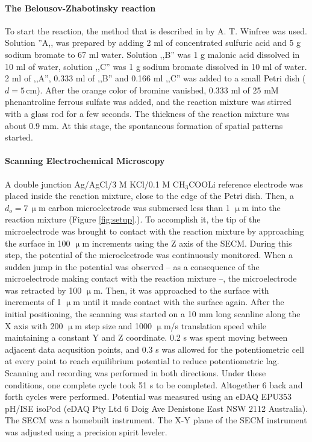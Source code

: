 \documentclass[3p, twocolumn]{elsarticle}
\begin{document}
\paragraph{The Belousov-Zhabotinsky reaction} 
To start the reaction, the method that is described in \cite{winfree} by A. T. Winfree was used.
Solution ''A,, was prepared by adding 2 ml of concentrated sulfuric acid and 5 g sodium bromate to 67 ml water.
Solution ,,B'' was 1 g malonic acid dissolved in 10 ml of water, solution ,,C'' was 1 g sodium bromate dissolved in 10 ml of water.
2 ml of ,,A'', 0.333 ml of ,,B'' and 0.166 ml ,,C'' was added to a small Petri dish ($d=5 \,$cm).
After the orange color of bromine vanished, 0.333 ml of 25 mM phenantroline ferrous sulfate was added, and the reaction mixture was stirred with a glass rod for a few seconds.
The thickness of the reaction mixture was about 0.9 mm.
At this stage, the spontaneous formation of spatial patterns started.

\paragraph{Scanning Electrochemical Microscopy} A double junction Ag/AgCl/3 M KCl/0.1 M CH$_3$COOLi reference electrode was placed inside the reaction mixture, close to the edge of the Petri dish.
Then, a $d_o=7\, \upmu$m carbon microelectrode was submersed less than 1 $\upmu$m into the reaction mixture (Figure \ref{fig:setup}.).
To accomplish it, the tip of the microelectrode was brought to contact with the reaction mixture by approaching the surface in 100 $\upmu$m increments using the Z axis of the SECM.
During this step, the potential of the microelectrode was continuously monitored.
When a sudden jump in the potential was observed -- as a consequence of the microelectrode making contact with the reaction mixture --, the microelectrode was retracted by 100 $\upmu$m.
Then, it was approached to the surface with increments of 1 $\upmu$m until it made contact with the surface again.
After the initial positioning, the scanning was started on a 10 mm long scanline along the X axis with 200 $\upmu$m step size and 1000 $\upmu$m/s translation speed while maintaining a constant Y and Z coordinate.
0.2 s was spent moving between adjacent data acqusition points, and 0.3 s was allowed for the potentiometric cell at every point to reach equilibrium potential to reduce potentiometric lag.
Scanning and recording was performed in both directions.
Under these conditions, one complete cycle took 51 s to be completed.
Altogether 6 back and forth cycles were performed.
Potential was measured using an eDAQ EPU353 pH/ISE isoPod (eDAQ Pty Ltd 6 Doig Ave Denistone East NSW 2112 Australia).
The SECM was a homebuilt instrument.
The X-Y plane of the SECM instrument was adjusted using a precision spirit leveler.
\end{document}
